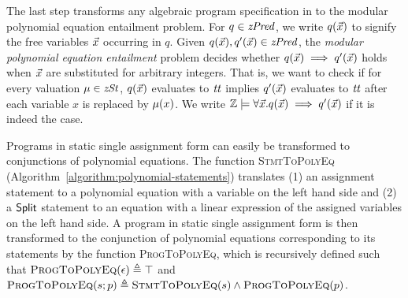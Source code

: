 
The last step transforms any algebraic program specification in \zdsl to the
modular polynomial equation entailment problem. For
$q \in \mathit{zPred}$, we write $q(\vec{x})$ to signify the free variables $\vec{x}$
occurring in $q$. Given $q(\vec{x}), q'(\vec{x}) \in \mathit{zPred}$, the \emph{modular
  polynomial equation entailment} problem decides whether
$q(\vec{x}) \implies q'(\vec{x})$ holds when $\vec{x}$ are substituted for
arbitrary integers. That is, we want to check if for every valuation $\mu \in \mathit{zSt}$, $q(\vec{x})$ evaluates to $\mathit{tt}$ implies $q'(\vec{x})$ evaluates to $\mathit{tt}$ after each variable $x$ is replaced by $\mu(x)$.
We write $\mathbb{Z} \models \forall \vec{x}. q(\vec{x}) \implies q'(\vec{x})$ if it is indeed the case.

Programs in static single assignment form can easily be transformed to
conjunctions of polynomial equations.
The function \textsc{StmtToPolyEq} (Algorithm~\ref{algorithm:polynomial-statements}) translates (1) an assignment statement to a polynomial equation with a variable on the left hand side and (2) a $\mbox{\textsf{Split}}$ statement to an equation with a linear expression of the assigned variables on the
left hand side.
A program in static single assignment form is then transformed to the
conjunction of polynomial equations corresponding to its statements by the function \textsc{ProgToPolyEq}, which is recursively defined such that $\textsc{ProgToPolyEq}(\epsilon) \triangleq \top$ and $\textsc{ProgToPolyEq}(s; p) \triangleq \textsc{StmtToPolyEq}(s) \wedge \textsc{ProgToPolyEq}(p)$.


